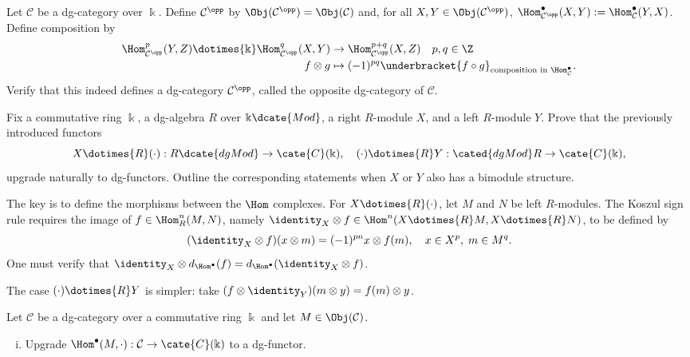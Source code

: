 \begin{Exercises}
	\item Let $\mathcal{C}$ be a dg-category over $\Bbbk$. Define
	$\mathcal{C}^{\opp}$ by $\Obj(\mathcal{C}^{\opp})=\Obj(\mathcal{C})$ and,
	for all $X,Y\in\Obj(\mathcal{C}^{\opp})$,
	$\Hom^\bullet_{\mathcal{C}^{\opp}}(X,Y):=
	\Hom^\bullet_{\mathcal{C}}(Y,X)$. Define composition by
	\begin{align*}
		\Hom^p_{\mathcal{C}^{\opp}}(Y, Z) \dotimes{\Bbbk} \Hom^q_{\mathcal{C}^{\opp}}(X, Y) & \to \Hom^{p+q}_{\mathcal{C}^{\opp}}(X, Z) \quad p, q \in \Z \\
		f \otimes g & \mapsto (-1)^{pq} \underbracket{f \circ g}_{\text{composition in }\Hom^\bullet_{\mathcal{C}}}.
	\end{align*}
	Verify that this indeed defines a dg-category $\mathcal{C}^{\opp}$, called
	the opposite dg-category of $\mathcal{C}$.

	\item Fix a commutative ring $\Bbbk$, a dg-algebra $R$ over
	$\Bbbk\dcate{Mod}$, a right $R$-module $X$, and a left $R$-module $Y$.
	Prove that the previously introduced functors
	\[ X \dotimes{R} (\cdot): R\dcate{dgMod} \to \cate{C}(\Bbbk), \quad (\cdot) \dotimes{R} Y: \cated{dgMod}R \to \cate{C}(\Bbbk), \]
	upgrade naturally to dg-functors. Outline the corresponding statements when
	$X$ or $Y$ also has a bimodule structure.

	\begin{hint}
		The key is to define the morphisms between the $\Hom$ complexes. For
		$X\dotimes{R}(\mathord\cdot)$, let $M$ and $N$ be left $R$-modules.
		The Koszul sign rule requires the image of $f\in\Hom^n_R(M,N)$,
		namely $\identity_X\otimes f\in
		\Hom^n(X\dotimes{R}M,X\dotimes{R}N)$, to be defined by
		\[ (\identity_X \otimes f)(x \otimes m) = (-1)^{pn} x \otimes f(m), \quad x \in X^p, \; m \in M^q. \]
		One must verify that
		$\identity_X\otimes d_{\Hom^\bullet}(f)=
		d_{\Hom^\bullet}(\identity_X\otimes f)$.

		The case $(\mathord\cdot)\dotimes{R}Y$ is simpler: take
		$(f\otimes\identity_Y)(m\otimes y)=f(m)\otimes y$.
	\end{hint}

	\item Let $\mathcal{C}$ be a dg-category over a commutative ring $\Bbbk$
	and let $M\in\Obj(\mathcal{C})$.
	\begin{enumerate}[(i)]
		\item Upgrade
		$\Hom^\bullet(M,\mathord\cdot):\mathcal{C}\to\cate{C}(\Bbbk)$ to a
		dg-functor.


\end{enumerate}
\end{Exercises}

